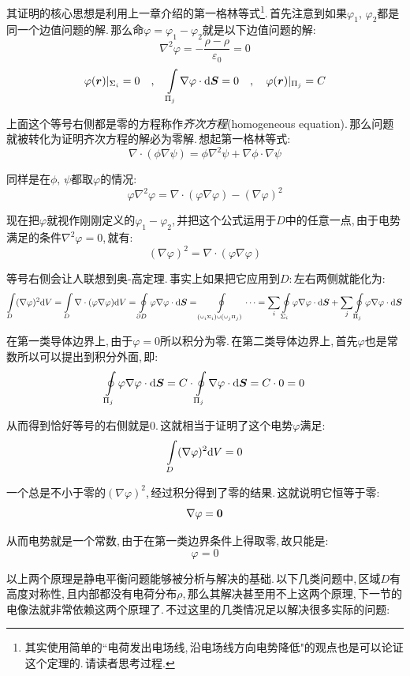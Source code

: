 其证明的核心思想是利用上一章介绍的第一格林等式\footnote{其实使用简单的``电荷发出电场线,\,沿电场线方向电势降低"的观点也是可以论证这个定理的.\,请读者思考过程.}.\,首先注意到如果$\varphi_1,\,\varphi_2$都是同一个边值问题的解.\,那么命$\varphi=\varphi_1-\varphi_2$就是以下边值问题的解:
\[\nabla^2\varphi=-\frac{\rho-\rho}{\varepsilon_0}=0\]
\[\varphi(\boldsymbol{r})|_{\Sigma_i}=0 \quad, \quad \int\limits_{\Pi_j}\nabla\varphi\cdot \textrm{d} \boldsymbol{S}=0 \quad, \quad \varphi(\boldsymbol{r})|_{\Pi_j}=C\]

上面这个等号右侧都是零的方程称作\emph{齐次方程}(homogeneous equation).\,那么问题就被转化为证明齐次方程的解必为零解.\,想起第一格林等式:
\[\nabla\cdot(\phi\nabla\psi)=\phi\nabla^2\psi+\nabla\phi\cdot\nabla\psi\]

同样是在$\phi,\,\psi$都取$\varphi$的情况:
\[\varphi\nabla^2\varphi=\nabla\cdot(\varphi\nabla\varphi)-(\nabla\varphi)^2\]

现在把$\varphi$就视作刚刚定义的$\varphi_1-\varphi_2$,\,并把这个公式运用于$D$中的任意一点,\,由于电势满足的条件$\nabla^2\varphi=0$,\,就有:
\[(\nabla\varphi)^2=\nabla\cdot(\varphi \nabla\varphi)\]

等号右侧会让人联想到奥-高定理.\,事实上如果把它应用到$D$:\,左右两侧就能化为:
\[\int\limits_D(\nabla\varphi)^2\textrm{d} V=\int\limits_D \nabla\cdot(\varphi \nabla\varphi)\textrm{d} V=\oint\limits_{\partial D}\varphi\nabla\varphi \cdot \textrm{d} \boldsymbol{S}=\oint\limits_{\scriptscriptstyle\left(\cup_i \Sigma_i\right)\cup \left(\cup_j\Pi_j  \right)}\cdots=\sum_i \oint\limits_{\Sigma_i}\varphi\nabla\varphi \cdot \textrm{d} \boldsymbol{S}+\sum_j \oint\limits_{\Pi_j}\varphi\nabla\varphi \cdot \textrm{d} \boldsymbol{S}\]

在第一类导体边界上,\,由于$\varphi=0$所以积分为零.\,在第二类导体边界上,\,首先$\varphi$也是常数所以可以提出到积分外面,\,即:
\[\oint\limits_{\Pi_j}\varphi\nabla\varphi \cdot \textrm{d} \boldsymbol{S}=C\cdot\oint\limits_{\Pi_j}\nabla\varphi \cdot \textrm{d} \boldsymbol{S}=C\cdot 0=0\]

从而得到恰好等号的右侧就是$0$.\,这就相当于证明了这个电势$\varphi$满足:
\[\int\limits_D(\nabla\varphi)^2\textrm{d} V=0\]

一个总是不小于零的$(\nabla\varphi)^2$,\,经过积分得到了零的结果.\,这就说明它恒等于零:
\[\nabla\varphi=\boldsymbol{0}\]

从而电势就是一个常数,\,由于在第一类边界条件上得取零,\,故只能是:
\[\varphi=0\]


以上两个原理是静电平衡问题能够被分析与解决的基础.\,以下几类问题中,\,区域$D$有高度对称性,\,且内部都没有电荷分布$\rho$,\,那么其解决甚至用不上这两个原理,\,下一节的电像法就非常依赖这两个原理了.\,不过这里的几类情况足以解决很多实际的问题:

